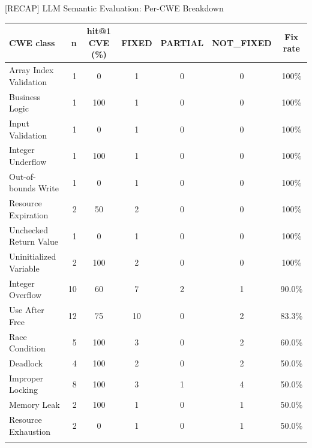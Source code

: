 \documentclass[aspectratio=169,10pt]{beamer}
\newcommand{\chit}[1]{\cellcolor{hit!30} #1}
\newcommand{\cmiss}[1]{\cellcolor{miss!25} #1}
\newcommand{\cwarn}[1]{\cellcolor{warn!30} #1}
\begin{document}
\begin{frame}{[RECAP] LLM Semantic Evaluation: Per-CWE Breakdown}

  \centering
  \vspace{-0.4em}
  {\tiny
  \renewcommand{\arraystretch}{1.15}
  \setlength{\tabcolsep}{3pt}
  \begin{tabular}{l r c c c c c}
    \toprule
    \textbf{CWE class}
      & \textbf{n}
      & \textbf{hit@1 CVE (\%)}
      & \textbf{FIXED}
      & \textbf{PARTIAL}
      & \textbf{NOT\_FIXED}
      & \textbf{Fix rate} \\
    \midrule
    \rowcolor{hit!8}
    Array Index Validation     & 1  & \cmiss{0}   & 1 & 0 & 0 & \chit{100\%} \\
    \rowcolor{hit!8}
    Business Logic             & 1  & \chit{100}  & 1 & 0 & 0 & \chit{100\%} \\
    \rowcolor{hit!8}
    Input Validation           & 1  & \cmiss{0}   & 1 & 0 & 0 & \chit{100\%} \\
    \rowcolor{hit!8}
    Integer Underflow          & 1  & \chit{100}  & 1 & 0 & 0 & \chit{100\%} \\
    \rowcolor{hit!8}
    Out-of-bounds Write        & 1  & \cmiss{0}   & 1 & 0 & 0 & \chit{100\%} \\
    \rowcolor{hit!8}
    Resource Expiration        & 2  & \cwarn{50}  & 2 & 0 & 0 & \chit{100\%} \\
    \rowcolor{hit!8}
    Unchecked Return Value     & 1  & \cmiss{0}   & 1 & 0 & 0 & \chit{100\%} \\
    \rowcolor{hit!8}
    Uninitialized Variable     & 2  & \chit{100}  & 2 & 0 & 0 & \chit{100\%} \\
    \addlinespace[2pt]
    Integer Overflow           & 10 & \cwarn{60}  & 7 & 2 & 1 & \chit{90.0\%} \\
    Use After Free             & 12 & \cwarn{75}  & 10 & 0 & 2 & \chit{83.3\%} \\
    Race Condition             & 5  & \chit{100}  & 3 & 0 & 2 & 60.0\% \\
    Deadlock                   & 4  & \chit{100}  & 2 & 0 & 2 & 50.0\% \\
    Improper Locking           & 8  & \chit{100}  & 3 & 1 & 4 & 50.0\% \\
    Memory Leak                & 2  & \chit{100}  & 1 & 0 & 1 & 50.0\% \\
    Resource Exhaustion        & 2  & \cmiss{0}   & 1 & 0 & 1 & 50.0\% \\
    \addlinespace[2pt]
    \rowcolor{miss!8}

\end{tabular}}
\end{frame}
\end{document}
